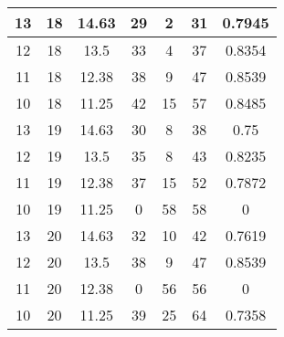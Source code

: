 \documentclass[letterpaper, 12pt]{article}
\begin{document}
\begin{longtable}{|c|c|c|c|c|c|c|}
\hline
13 & 18 & 14.63 & 29 & 2 & 31 & 0.7945 \\
\hline
12 & 18 & 13.5 & 33 & 4 & 37 & 0.8354 \\
\hline
11 & 18 & 12.38 & 38 & 9 & 47 & 0.8539 \\
\hline
10 & 18 & 11.25 & 42 & 15 & 57 & 0.8485 \\
\hline
13 & 19 & 14.63 & 30 & 8 & 38 & 0.75 \\
\hline
12 & 19 & 13.5 & 35 & 8 & 43 & 0.8235 \\
\hline
11 & 19 & 12.38 & 37 & 15 & 52 & 0.7872 \\
\hline
10 & 19 & 11.25 & 0 & 58 & 58 & 0 \\
\hline
13 & 20 & 14.63 & 32 & 10 & 42 & 0.7619 \\
\hline
12 & 20 & 13.5 & 38 & 9 & 47 & 0.8539 \\
\hline
11 & 20 & 12.38 & 0 & 56 & 56 & 0 \\
\hline
10 & 20 & 11.25 & 39 & 25 & 64 & 0.7358 \\
\hline
\end{longtable}
\end{document}

